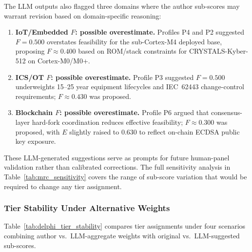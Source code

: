 The LLM outputs also flagged three domains where the author sub-scores
may warrant revision based on domain-specific reasoning:

\begin{enumerate}
  \item \textbf{IoT/Embedded $F$: possible overestimate.} Profiles P4 and
  P2 suggested $F{=}0.500$ overstates feasibility for the sub-Cortex-M4
  deployed base, proposing $F{\approx}0.400$ based on ROM/stack constraints
  for CRYSTALS-Kyber-512 on Cortex-M0/M0+.

  \item \textbf{ICS/OT $F$: possible overestimate.} Profile P3 suggested
  $F{=}0.500$ underweights 15--25 year equipment lifecycles and IEC~62443
  change-control requirements; $F{\approx}0.430$ was proposed.

  \item \textbf{Blockchain $F$: possible overestimate.} Profile P6 argued
  that consensus-layer hard-fork coordination reduces effective feasibility;
  $F{\approx}0.300$ was proposed, with $E$ slightly raised to 0.630 to
  reflect on-chain ECDSA public key exposure.
\end{enumerate}

These LLM-generated suggestions serve as prompts for future human-panel
validation rather than calibrated corrections. The full sensitivity
analysis in Table~\ref{tab:mrc_sensitivity} covers the range of sub-score
variation that would be required to change any tier assignment.

\subsubsection*{Tier Stability Under Alternative Weights}

Table~\ref{tab:delphi_tier_stability} compares tier assignments under
four scenarios combining author vs.\ LLM-aggregate weights with original
vs.\ LLM-suggested sub-scores.

